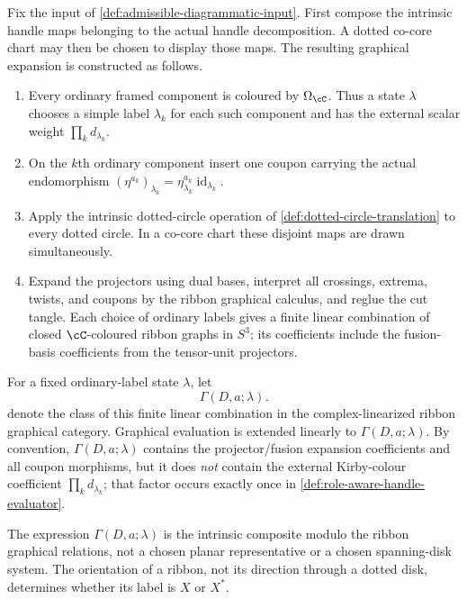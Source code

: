 \begin{definition}
\label{def:role-aware-graphical-expansion}
Fix the input of \cref{def:admissible-diagrammatic-input}.  First compose the
intrinsic handle maps belonging to the actual handle decomposition.  A dotted
co-core chart may then be chosen to display those maps.  The resulting
graphical expansion is constructed as follows.
\begin{enumerate}[label=(\roman*),ref=\roman*]
  \item\label{item:ordinary-kirby-expansion}
  Every ordinary framed component is coloured by $\Omega_{\cC}$.  Thus a
  state $\lambda$ chooses a simple label $\lambda_k$ for each such component
  and has the external scalar weight $\prod_k d_{\lambda_k}$.

  \item\label{item:character-coupons}
  On the $k$th ordinary component insert one coupon carrying
  the actual endomorphism
  $(\eta^{a_k})_{\lambda_k}
   =\eta_{\lambda_k}^{a_k}\operatorname{id}_{\lambda_k}$.

  \item\label{item:dotted-cut-projector}
  Apply the intrinsic dotted-circle operation of
  \cref{def:dotted-circle-translation} to every dotted circle.  In a co-core
  chart these disjoint maps are drawn simultaneously.

  \item\label{item:graphical-regluing}
  Expand the projectors using dual bases, interpret all crossings, extrema,
  twists, and coupons by the ribbon graphical calculus, and reglue the cut
  tangle.  Each choice of ordinary labels gives a finite linear combination
  of closed $\cC$-coloured ribbon graphs in $S^3$; its coefficients include
  the fusion-basis coefficients from the tensor-unit projectors.
\end{enumerate}
For a fixed ordinary-label state $\lambda$, let
\[
  \Gamma(D,a;\lambda).
\]
denote the class of this finite linear combination in the complex-linearized
ribbon graphical category.  Graphical evaluation is extended linearly to
$\Gamma(D,a;\lambda)$.  By convention,
$\Gamma(D,a;\lambda)$ contains the projector/fusion expansion coefficients
and all coupon morphisms, but it does \emph{not} contain the external
Kirby-colour coefficient $\prod_kd_{\lambda_k}$; that factor occurs exactly
once in \cref{def:role-aware-handle-evaluator}.
\end{definition}

\begin{remark}
\label{rem:role-aware-expansion-intrinsic-meaning}
The expression $\Gamma(D,a;\lambda)$ is the intrinsic composite modulo the
ribbon graphical relations, not a chosen planar representative or a chosen
spanning-disk system.  The orientation of a ribbon, not its direction through
a dotted disk, determines whether its label is $X$ or $X^*$.
\end{remark}

